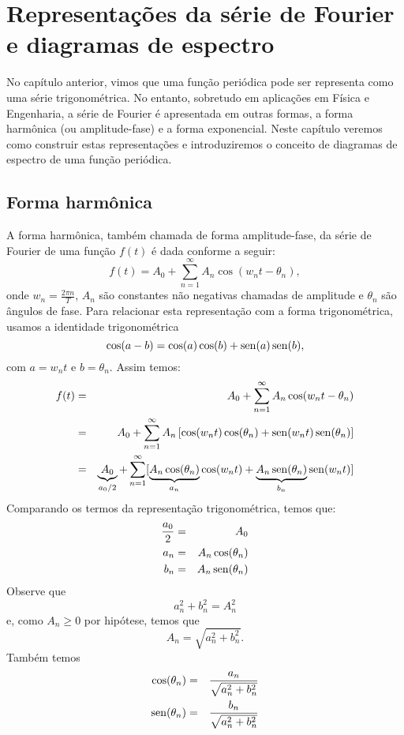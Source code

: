 
\chapter{Representações da série de Fourier e diagramas de espectro}

No capítulo anterior, vimos que uma função periódica pode ser representa como uma série trigonométrica. No entanto, sobretudo em aplicações em Física e Engenharia, a série de Fourier é apresentada em outras formas, a forma harmônica (ou amplitude-fase) e a forma exponencial. Neste capítulo veremos como construir estas representações e introduziremos o conceito de diagramas de espectro de uma função periódica.

\section{Forma harmônica}
A forma harmônica, também chamada de forma amplitude-fase, da série de Fourier de uma função $f(t)$ é dada conforme a seguir:
$$
f(t)=A_0+\sum_{n=1}^\infty A_n\cos(w_n t-\theta_n),
$$
onde $w_n=\frac{2\pi n}{T}$, $A_n$ são constantes não negativas chamadas de amplitude e $\theta_n$ são ângulos de fase. Para relacionar esta representação com a forma trigonométrica, usamos a identidade trigonométrica
$$
\cos(a-b)=\cos(a)\cos(b)+\operatorname{sen}(a)\operatorname{sen}(b),
$$
com $a=w_n t$ e $b=\theta_n$. Assim temos:
\begin{eqnarray*}
f(t)&=&A_0+\sum_{n=1}^\infty A_n\cos(w_n t-\theta_n)\\
&=&A_0+\sum_{n=1}^\infty A_n\left[\cos(w_n t)\cos(\theta_n)+\operatorname{sen}(w_n t)\operatorname{sen}(\theta_n)\right]\\
&=&\underbrace{A_0}_{a_0/2}+\sum_{n=1}^\infty[ \underbrace{A_n\cos(\theta_n)}_{a_n} \cos(w_n t)+\underbrace{A_n\operatorname{sen}(\theta_n)}_{b_n}\operatorname{sen}(w_n t)]
\end{eqnarray*}
Comparando os termos da representação trigonométrica, temos que:
\begin{eqnarray*}
\frac{a_0}{2}&=&A_0\\
a_n&=&A_n\cos(\theta_n)\\
b_n&=&A_n\operatorname{sen}(\theta_n)\\
\end{eqnarray*}
Observe que
$$
a_n^2+b_n^2=A_n^2
$$
e, como $A_n\geq 0$ por hipótese, temos que 
$$
A_n=\sqrt{a_n^2+b_n^2}.
$$
Também temos
\begin{eqnarray*}
\cos(\theta_n)&=&\frac{a_n}{\sqrt{a_n^2+b_n^2}}\\
\operatorname{sen}(\theta_n)&=&\frac{b_n}{\sqrt{a_n^2+b_n^2}}
\end{eqnarray*}

